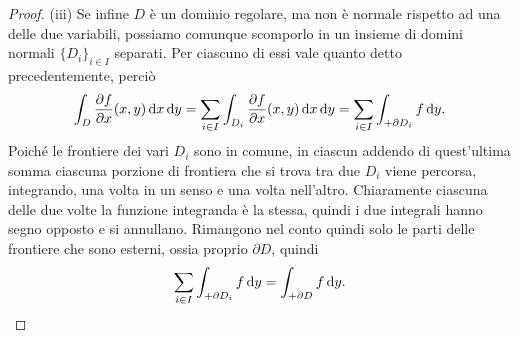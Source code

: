 \begin{proof}
	(iii) Se infine $D$ è un dominio regolare, ma non è normale rispetto ad una delle due variabili, possiamo comunque scomporlo in un insieme di domini normali $\{D_i\}_{i\in I}$ separati.
	Per ciascuno di essi vale quanto detto precedentemente, perciò
	\begin{equation}
		\int_D\frac{\partial {f}}{\partial {x}}(x,y)\,\textup{d} x\,\textup{d} y=\sum_{i\in I}\int_{D_i}\frac{\partial {f}}{\partial {x}}(x,y)\,\textup{d} x\,\textup{d} y=\sum_{i\in I}\int_{+\partial D_i}f\,\textup{d} y.
	\end{equation}
	Poich\'e le frontiere dei vari $D_i$ sono in comune, in ciascun addendo di quest'ultima somma ciascuna porzione di frontiera che si trova tra due $D_i$ viene percorsa, integrando, una volta in un senso e una volta nell'altro.
	Chiaramente ciascuna delle due volte la funzione integranda è la stessa, quindi i due integrali hanno segno opposto e si annullano.
	Rimangono nel conto quindi solo le parti delle frontiere che sono esterni, ossia proprio $\partial D$, quindi
	\begin{equation}
		\sum_{i\in I}\int_{+\partial D_i}f\,\textup{d} y=\int_{+\partial D}f\,\textup{d} y.\qedhere
	\end{equation}
\end{proof}

